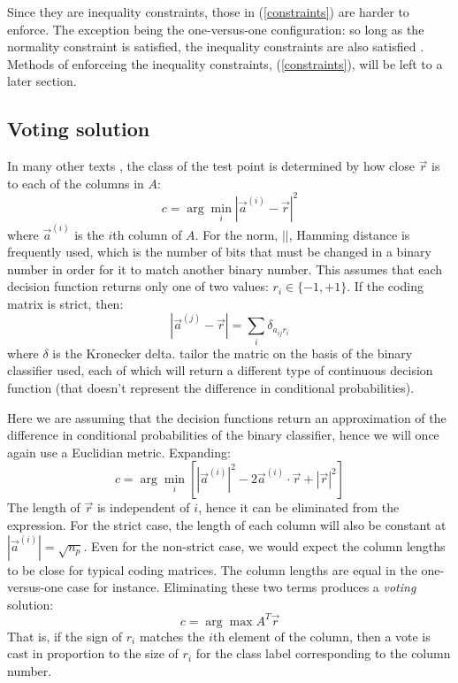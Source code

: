 \documentclass{article}
\begin{document}
Since they are inequality constraints, those in (\ref{constraints}) are
harder to enforce.
The exception being the one-versus-one configuration: so long as the normality
constraint is satisfied, the inequality constraints are also satisfied
\citep{Wu_etal2004}.
Methods of enforceing the inequality constraints, (\ref{constraints}), will
be left to a later section.

\subsection{Voting solution}

In many other texts \citep{Allwein_etal2000, Hsu_Lin2002, Dietterich_Bakiri1995},
the class of the test point is determined by how close $\vec r$
is to each of the columns in $A$:
\begin{equation}
	c = \arg \min_i |\vec a^{(i)} - \vec r|^2
\end{equation}
where $\vec a^{(i)}$ is the $i$th column of $A$.
For the norm, $||$, Hamming distance is
frequently used, which is the number of bits that must be changed
in a binary number in order for it to match another binary number.
This assumes that each decision function returns only one of two values: 
$r_i \in \lbrace -1, +1 \rbrace$.
If the coding matrix is strict, then:
\begin{equation}
	|\vec a^{(j)} - \vec r| = \sum_i \delta_{a_{ij} r_i}
\end{equation}
where $\delta$ is the Kronecker delta.
\citet{Allwein_etal2000} 
tailor the matric on the basis of the binary classifier used, each of which
will return a different type of continuous decision function 
(that doesn't represent the difference in conditional probabilities).

Here we are assuming that the decision functions return an approximation of the 
difference in conditional probabilities of the binary classifier, hence we will once again use a
Euclidian metric. Expanding:
\begin{equation}
	c = \arg \min_i \left [|\vec a^{(i)}|^2 - 2 \vec a^{(i)} \cdot \vec r + |\vec r|^2 \right ]
\end{equation}
The length of $\vec r$ is independent of $i$, hence it can be eliminated from the expression.
For the strict case, the length of each column will also be constant at $|\vec a^{(i)}|=\sqrt{n_p}$.
Even for the non-strict case, we would expect the column lengths to be close for typical coding 
matrices. The column lengths are equal in the one-versus-one case for instance.
Eliminating these two terms produces a {\it voting} solution:
\begin{equation}
	c = \arg \max A^T \vec r
\end{equation}
That is, if the sign of $r_i$ matches the $i$th element of the column, then a vote is cast 
in proportion to the size of $r_i$ for the class label corresponding to the column number.
\end{document}
